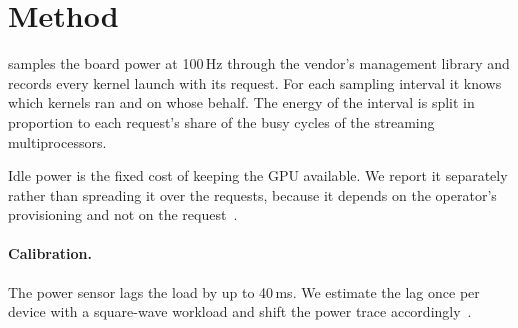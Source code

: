 \section{Method}\label{sec:method}

\sysname{} samples the board power at 100\,Hz through the vendor's management library and records every kernel launch with its request.
For each sampling interval it knows which kernels ran and on whose behalf.
The energy of the interval is split in proportion to each request's share of the busy cycles of the streaming multiprocessors.

Idle power is the fixed cost of keeping the GPU available.
We report it separately rather than spreading it over the requests, because it depends on the operator's provisioning and not on the request~\cite{ostrowski2023idle}.

\paragraph{Calibration.} The power sensor lags the load by up to 40\,ms.
We estimate the lag once per device with a square-wave workload and shift the power trace accordingly~\cite{varga2022lag}.
